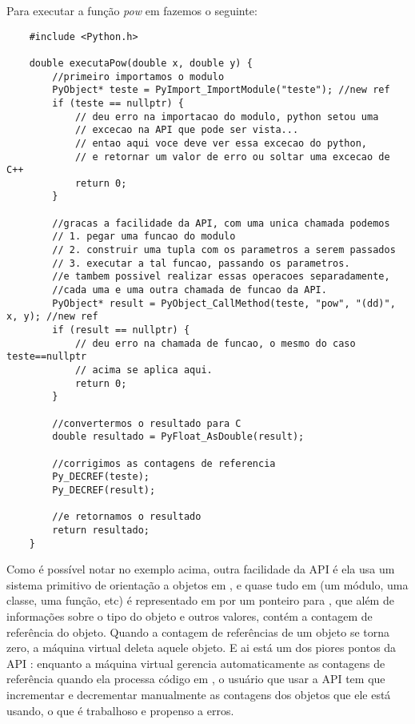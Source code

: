     Para executar a função \emph{pow} em \CXX{} fazemos o seguinte:
    \begin{lstlisting}
    #include <Python.h>
    
    double executaPow(double x, double y) {
        //primeiro importamos o modulo
        PyObject* teste = PyImport_ImportModule("teste"); //new ref
        if (teste == nullptr) {
            // deu erro na importacao do modulo, python setou uma 
            // excecao na API que pode ser vista...
            // entao aqui voce deve ver essa excecao do python,
            // e retornar um valor de erro ou soltar uma excecao de C++
            return 0;
        }
        
        //gracas a facilidade da API, com uma unica chamada podemos
        // 1. pegar uma funcao do modulo
        // 2. construir uma tupla com os parametros a serem passados
        // 3. executar a tal funcao, passando os parametros.
        //e tambem possivel realizar essas operacoes separadamente,
        //cada uma e uma outra chamada de funcao da API.
        PyObject* result = PyObject_CallMethod(teste, "pow", "(dd)", x, y); //new ref
        if (result == nullptr) {
            // deu erro na chamada de funcao, o mesmo do caso teste==nullptr
            // acima se aplica aqui.
            return 0;
        }
        
        //convertermos o resultado para C
        double resultado = PyFloat_AsDouble(result);
        
        //corrigimos as contagens de referencia
        Py_DECREF(teste);
        Py_DECREF(result);
        
        //e retornamos o resultado
        return resultado;
    }
    \end{lstlisting}
    
    Como é possível notar no exemplo acima, outra facilidade da API é ela usa um sistema 
    primitivo de orientação a objetos em \C{}, e quase tudo em  (um módulo, uma 
    classe, uma função, etc) é representado em \C{} por um ponteiro para , 
    que além de informações sobre o tipo do objeto e outros valores, contém a contagem de 
    referência do objeto. Quando a contagem de referências de um objeto se torna zero, a 
    máquina virtual deleta aquele objeto. E ai está um dos piores pontos da API : 
    enquanto a máquina virtual gerencia automaticamente as contagens de referência
    quando ela processa código em , o usuário que usar a API \C{} tem que incrementar e 
    decrementar manualmente as contagens dos objetos que ele está usando, o que é trabalhoso e 
    propenso a erros.
    
